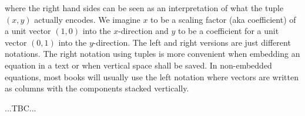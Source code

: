 where the right hand sides can be seen as an interpretation of what the tuple $(x,y)$ actually encodes. We imagine $x$ to be a scaling factor (aka coefficient) of a unit vector $(1,0)$ into the $x$-direction and $y$ to be a coefficient for a unit vector $(0,1)$ into the $y$-direction. The left and right versions are just different notations. The right notation using tuples is more convenient when embedding an equation in a text or when vertical space shall be saved. In non-embedded equations, most books will usually use the left notation where vectors are written as columns with the components stacked vertically. 




...TBC...






